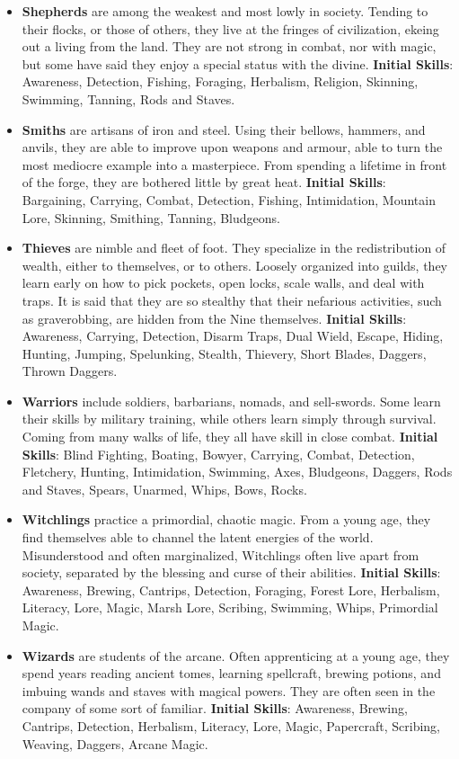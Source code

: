 \begin{itemize}
\item {\bf Shepherds} are among the weakest and most lowly in society.  
Tending to their flocks, or those of others, they live at the fringes of 
civilization, ekeing out a living from the land.  They are not strong in 
combat, nor with magic, but some have said they enjoy a special status 
with the divine.  \textbf{Initial Skills}: Awareness, Detection, Fishing,
Foraging, Herbalism, Religion, Skinning, Swimming, Tanning, Rods and 
Staves.

\item {\bf Smiths} are artisans of iron and steel.  Using their bellows, 
hammers, and anvils, they are able to improve upon weapons and armour, 
able to turn the most mediocre example into a masterpiece.  From spending 
a lifetime in front of the forge, they are bothered little by great heat.
\textbf{Initial Skills}: Bargaining, Carrying, Combat, Detection, 
Fishing, Intimidation, Mountain Lore, Skinning, Smithing, Tanning,
Bludgeons.

\item {\bf Thieves} are nimble and fleet of foot.  They specialize in the 
redistribution of wealth, either to themselves, or to others.  Loosely 
organized into guilds, they learn early on how to pick pockets, open 
locks, scale walls, and deal with traps.  It is said that they are so
stealthy that their nefarious activities, such as graverobbing, are hidden
from the Nine themselves.  \textbf{Initial Skills}: Awareness, Carrying, 
Detection, Disarm Traps, Dual Wield, Escape, Hiding, Hunting, Jumping, 
Spelunking, Stealth, Thievery, Short Blades, Daggers, Thrown Daggers.

\item {\bf Warriors} include soldiers, barbarians, nomads, and sell-swords.
Some learn their skills by military training, while others learn simply 
through survival.  Coming from many walks of life, they all have skill in 
close combat.  \textbf{Initial Skills}: Blind Fighting, Boating, Bowyer,
Carrying, Combat, Detection, Fletchery, Hunting, Intimidation, Swimming,
Axes, Bludgeons, Daggers, Rods and Staves, Spears, Unarmed, Whips, Bows,
Rocks.

\item {\bf Witchlings} practice a primordial, chaotic magic.  From a young 
age, they find themselves able to channel the latent energies of the 
world.  Misunderstood and often marginalized, Witchlings often live apart 
from society, separated by the blessing and curse of their abilities.
\textbf{Initial Skills}: Awareness, Brewing, Cantrips, Detection, Foraging,
Forest Lore, Herbalism, Literacy, Lore, Magic, Marsh Lore, Scribing,
Swimming, Whips, Primordial Magic.

\item {\bf Wizards} are students of the arcane.  Often apprenticing at a 
young age, they spend years reading ancient tomes, learning spellcraft, 
brewing potions, and imbuing wands and staves with magical powers.  They 
are often seen in the company of some sort of familiar.
\textbf{Initial Skills}: Awareness, Brewing, Cantrips, Detection,
Herbalism, Literacy, Lore, Magic, Papercraft, Scribing, Weaving, Daggers,
Arcane Magic.
\end{itemize}

